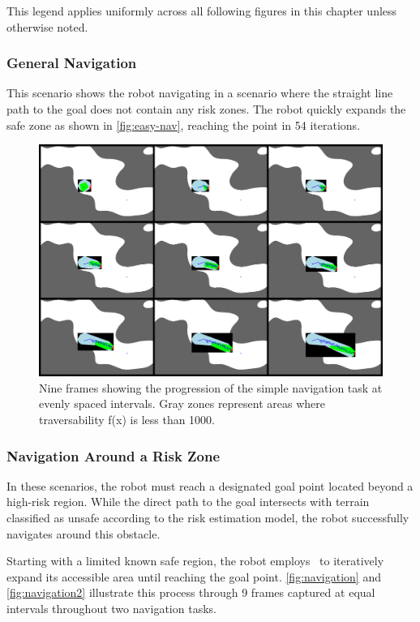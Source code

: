 This legend applies uniformly across all following figures in this chapter unless otherwise noted. 

\subsubsection{General Navigation}

This scenario shows the robot navigating in a scenario where the straight line path to the goal does not contain any risk zones. The robot quickly expands the safe zone as shown in \autoref{fig:easy-nav}, reaching the point in 54 iterations.

\begin{figure}[h]
    \centering
    \includegraphics[width=1\linewidth]{figures/easynavigation.png}
    \caption{Nine frames showing the progression of the simple navigation task at evenly spaced intervals. Gray zones represent areas where traversability f(x) is less than 1000.}
    \label{fig:easy-nav}
\end{figure}

\subsubsection{Navigation Around a Risk Zone}
In these scenarios, the robot must reach a designated goal point located beyond a high-risk region. While the direct path to the goal intersects with terrain classified as unsafe according to the risk estimation model, the robot successfully navigates around this obstacle.

Starting with a limited known safe region, the robot employs \algoname\ to iteratively expand its accessible area until reaching the goal point. \autoref{fig:navigation} and \autoref{fig:navigation2} illustrate this process through 9 frames captured at equal intervals throughout two navigation tasks.

